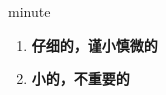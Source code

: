 
\begin{frame}
{\huge minute}
\begin{center}
\begin{enumerate}\Large
  \item \textbf{仔细的，谨小慎微的}
  \item \textbf{小的，不重要的}
\end{enumerate}
\end{center}
\end{frame}
